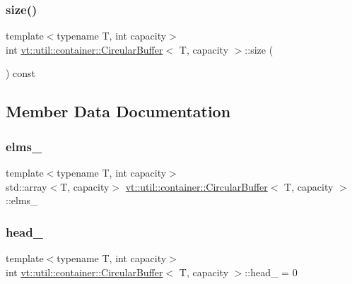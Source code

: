 \subsubsection{\texorpdfstring{size()}{size()}}
{\footnotesize\ttfamily template$<$typename T, int capacity$>$ \\
int \hyperlink{structvt_1_1util_1_1container_1_1_circular_buffer}{vt\+::util\+::container\+::\+Circular\+Buffer}$<$ T, capacity $>$\+::size (\begin{DoxyParamCaption}{ }\end{DoxyParamCaption}) const\hspace{0.3cm}{\ttfamily [inline]}}



\subsection{Member Data Documentation}
\mbox{\label{structvt_1_1util_1_1container_1_1_circular_buffer_a9c05e2d6d78d7db1a57ff24a00f928e0}} 
\subsubsection{\texorpdfstring{elms\+\_\+}{elms\_}}
{\footnotesize\ttfamily template$<$typename T, int capacity$>$ \\
std\+::array$<$T, capacity$>$ \hyperlink{structvt_1_1util_1_1container_1_1_circular_buffer}{vt\+::util\+::container\+::\+Circular\+Buffer}$<$ T, capacity $>$\+::elms\+\_\+\hspace{0.3cm}{\ttfamily [private]}}

\mbox{\label{structvt_1_1util_1_1container_1_1_circular_buffer_a543bede3221fb2df06bd856bc4a45f21}} 
\subsubsection{\texorpdfstring{head\+\_\+}{head\_}}
{\footnotesize\ttfamily template$<$typename T, int capacity$>$ \\
int \hyperlink{structvt_1_1util_1_1container_1_1_circular_buffer}{vt\+::util\+::container\+::\+Circular\+Buffer}$<$ T, capacity $>$\+::head\+\_\+ = 0\hspace{0.3cm}{\ttfamily [private]}}

